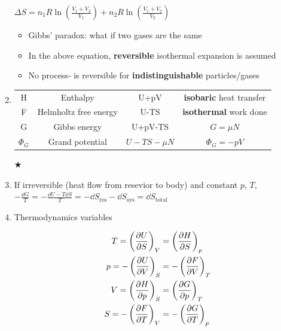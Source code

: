 \documentclass{article}
\theoremstyle{remark}
\newcommand{\mylabel}[2]{\hyperref[#1]{#2}\label{back:#1}}
\begin{document}
\begin{enumerate}
    $\Delta S = n_1 R\ln\left(\frac{V_1+V_2}{V_1}\right)+n_2 R\ln\left(\frac{V_1+V_2}{V_2}\right)$\begin{itemize}
        \item Gibbs' paradox: what if two gases are the same
        \item In the above equation, \textbf{reversible} isothermal expansion is assumed
        \item No process- is reversible for \textbf{indistinguishable} particles/gases
    \end{itemize}
    \item \begin{tabular}{|c|c|c|c|}
        H & Enthalpy & U+pV & \textbf{isobaric} heat transfer\\
        F & Helmholtz free energy & U-TS & \textbf{isothermal} work done\\
        G & Gibbs energy & U+pV-TS & $\boxed{G=\mu N}$\\
        $\Phi_G$ & Grand potential & $U-TS-\mu N$ & $\boxed{\Phi_G=-pV}$\\
    \end{tabular}\mylabel{mu_and_G}{$\bigstar$}
    \item If irreversible (heat flow from resevior to body) and constant $p$, $T$, \newline
            $-\frac{\dd G}{T} = -\frac{\dd U-T\dd S}{T}= -\dd S_{\text{res}}-\dd S_{\text{sys}} = \dd S_{\text{total}}$
    \item Thermodynamics variables\newline
        \begin{minipage}{0.7\linewidth}
            \begin{align*}
                T  = \left(\pdv{U}{S}\right)_V &= \left(\pdv{H}{S}\right)_p\\
                p = -\left(\pdv{U}{V}\right)_S &= -\left(\pdv{F}{V}\right)_T\\
                V = \left(\pdv{H}{p}\right)_S &= \left(\pdv{G}{p}\right)_T\\
                S = -\left(\pdv{F}{T}\right)_V &= -\left(\pdv{G}{T}\right)_p
            \end{align*}
        \end{minipage}
        \begin{minipage}{0.3\linewidth}

\end{minipage}
\end{enumerate}
\end{document}

